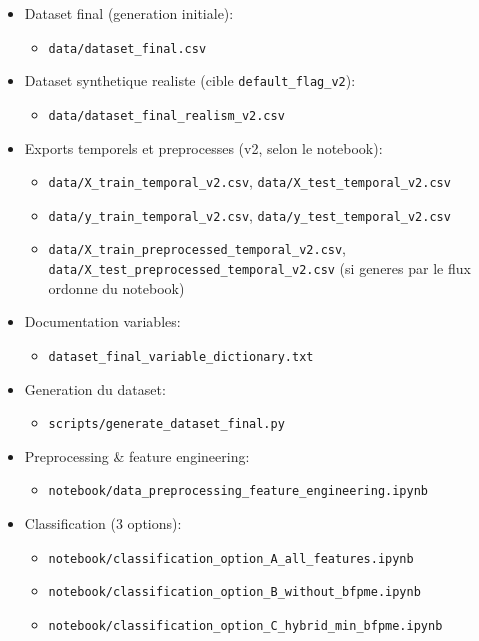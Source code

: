 \documentclass[11pt,a4paper]{article}
\begin{document}
\begin{itemize}[leftmargin=1.2cm]
  \item Dataset final (generation initiale):
  \begin{itemize}
    \item \texttt{data/dataset\_final.csv}
  \end{itemize}

  \item Dataset synthetique realiste (cible \texttt{default\_flag\_v2}):
  \begin{itemize}
    \item \texttt{data/dataset\_final\_realism\_v2.csv}
  \end{itemize}

  \item Exports temporels et preprocesses (v2, selon le notebook):
  \begin{itemize}
    \item \texttt{data/X\_train\_temporal\_v2.csv}, \texttt{data/X\_test\_temporal\_v2.csv}
    \item \texttt{data/y\_train\_temporal\_v2.csv}, \texttt{data/y\_test\_temporal\_v2.csv}
    \item \texttt{data/X\_train\_preprocessed\_temporal\_v2.csv}, \texttt{data/X\_test\_preprocessed\_temporal\_v2.csv} (si generes par le flux ordonne du notebook)
  \end{itemize}

  \item Documentation variables:
  \begin{itemize}
    \item \texttt{dataset\_final\_variable\_dictionary.txt}
  \end{itemize}

  \item Generation du dataset:
  \begin{itemize}
    \item \texttt{scripts/generate\_dataset\_final.py}
  \end{itemize}

  \item Preprocessing \& feature engineering:
  \begin{itemize}
    \item \texttt{notebook/data\_preprocessing\_feature\_engineering.ipynb}
  \end{itemize}

  \item Classification (3 options):
  \begin{itemize}
    \item \texttt{notebook/classification\_option\_A\_all\_features.ipynb}
    \item \texttt{notebook/classification\_option\_B\_without\_bfpme.ipynb}
    \item \texttt{notebook/classification\_option\_C\_hybrid\_min\_bfpme.ipynb}
  \end{itemize}


\end{itemize}
\end{document}
